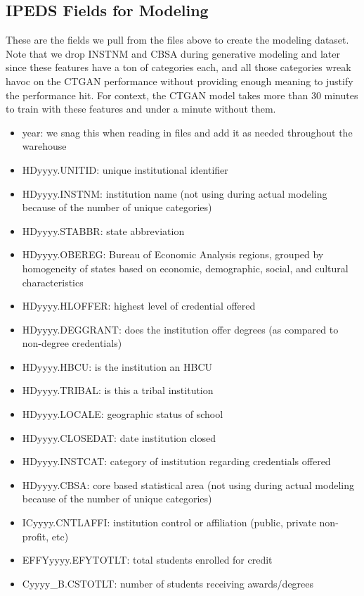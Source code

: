\documentclass[sigconf, authorversion, nonacm]{acmart}
\begin{document}
    \subsection{IPEDS Fields for Modeling}
        These are the fields we pull from the files above to create the modeling dataset. Note that we drop INSTNM and CBSA during generative modeling and later since these features have a ton of categories each, and all those categories wreak havoc on the CTGAN performance without providing enough meaning to justify the performance hit. For context, the CTGAN model takes more than 30 minutes to train with these features and under a minute without them.

        \begin{itemize}
            \item year: we snag this when reading in files and add it as needed throughout the warehouse
            \item HDyyyy.UNITID: unique institutional identifier
            \item HDyyyy.INSTNM: institution name (not using during actual modeling because of the number of unique categories)
            \item HDyyyy.STABBR: state abbreviation
            \item HDyyyy.OBEREG: Bureau of Economic Analysis regions, grouped by homogeneity of states based on economic, demographic, social, and cultural characteristics
            \item HDyyyy.HLOFFER: highest level of credential offered
            \item HDyyyy.DEGGRANT: does the institution offer degrees (as compared to non-degree credentials)
            \item HDyyyy.HBCU: is the institution an HBCU
            \item HDyyyy.TRIBAL: is this a tribal institution
            \item HDyyyy.LOCALE: geographic status of school
            \item HDyyyy.CLOSEDAT: date institution closed
            \item HDyyyy.INSTCAT: category of institution regarding credentials offered
            \item HDyyyy.CBSA: core based statistical area (not using during actual modeling because of the number of unique categories)
            \item ICyyyy.CNTLAFFI: institution control or affiliation (public, private non-profit, etc)
            \item EFFYyyyy.EFYTOTLT: total students enrolled for credit
            \item Cyyyy_B.CSTOTLT: number of students receiving awards/degrees
        \end{itemize}
\end{document}
